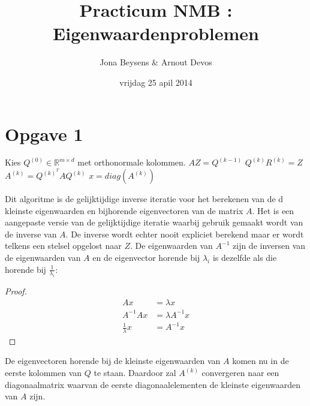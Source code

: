 \documentclass[a4paper]{article}
\title{Practicum NMB : Eigenwaardenproblemen}
\author{Jona Beysens \& Arnout Devos}
\date{vrijdag 25 apil 2014}
\newcommand{\opgave}[1]{\section*{Opgave #1}}
\begin{document}
\maketitle

\opgave{1}

\begin{algorithmic}
\State Kies $Q^{(0)} \in \mathbb{R}^{m\times d}$ met orthonormale kolommen.
    \State $AZ=Q^{(k-1)}$
    \State $Q^{(k)}R^{(k)}=Z$
    \State $A^{(k)}=Q^{(k)^{T}}AQ^{(k)}$
\EndFor
\State $x = diag(A^{(k)})$
\end{algorithmic}

Dit algoritme is de gelijktijdige inverse iteratie voor het berekenen van de d kleinste eigenwaarden en bijhorende eigenvectoren van de matrix $A$. Het is een aangepaste versie van de gelijktijdige iteratie waarbij gebruik gemaakt wordt van de inverse van $A$. De inverse wordt echter nooit expliciet berekend maar er wordt telkens een stelsel opgelost naar $Z$. De eigenwaarden van $A^{-1}$ zijn de inversen van de eigenwaarden van $A$ en de eigenvector horende bij $\lambda_i$ is dezelfde als die horende bij $\frac{1}{\lambda_i}$:
\begin{proof}
\begin{align}
	Ax &= \lambda x \label{eq1}\\ 
    A^{-1}Ax &= \lambda A^{-1}x \label{eq2}\\
    \frac{1}{\lambda}x &= A^{-1}x \label{eq:const1}
\end{align}
\end{proof}
De eigenvectoren horende bij de kleinste eigenwaarden van $A$ komen nu in de eerste kolommen van $Q$ te staan. Daardoor zal $A^{(k)}$ convergeren naar een diagonaalmatrix waarvan de eerste diagonaalelementen de kleinste eigenwaarden van $A$ zijn.
\end{document}
